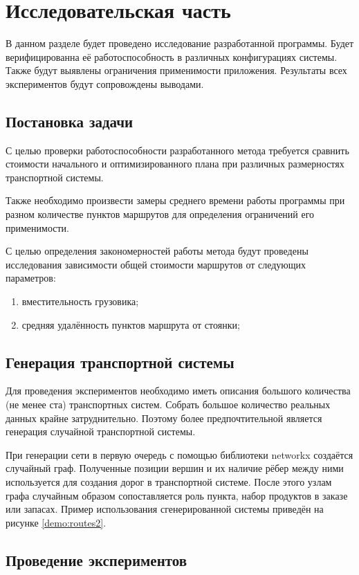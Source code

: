 \section{Исследовательская часть}

В данном разделе будет проведено исследование разработанной программы. Будет верифицированна её работоспособность в различных конфигурациях системы. Также будут выявлены ограничения применимости приложения. Результаты всех экспериментов будут сопровождены выводами.  

\subsection{Постановка задачи}
С целью проверки работоспособности разработанного метода требуется сравнить стоимости начального и оптимизированного плана при различных размерностях транспортной системы.

Также необходимо произвести замеры среднего времени работы программы при разном количестве пунктов маршрутов для определения ограничений его применимости.

С целью определения закономерностей работы метода будут проведены исследования зависимости общей стоимости маршрутов от следующих параметров:

\begin{enumerate}
	\item вместительность грузовика;
	\item средняя удалённость пунктов маршрута от стоянки;
\end{enumerate}

\subsection{Генерация транспортной системы}
Для проведения экспериментов необходимо иметь описания большого количества (не менее ста) транспортных систем. Собрать большое количество реальных данных крайне затруднительно. Поэтому более предпочтительной является генерация случайной транспортной системы.

При генерации сети в первую очередь с помощью библиотеки networkx создаётся случайный граф. Полученные позиции вершин и их наличие рёбер между ними используется для создания дорог в транспортной системе. После этого узлам графа случайным образом сопоставляется роль пункта, набор продуктов в заказе или запасах. Пример использования сгенерированной системы приведён на рисунке \ref{demo:routes2}.

\subsection{Проведение экспериментов}

